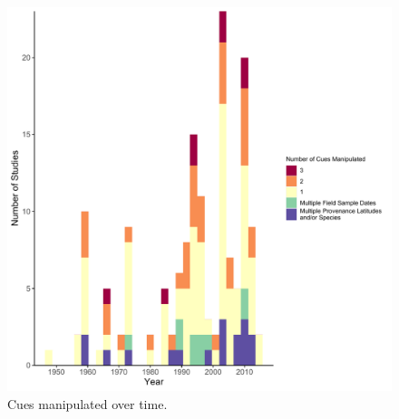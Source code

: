 \documentclass[11pt,letter]{article}
\begin{document}
\begin{figure}[t!]
\centering
\includegraphics[width=1\textwidth]{..//..//analyses/limitingcues/figures/studyyearcues.pdf}
\caption{Cues manipulated over time.}
  \label{fig:ts}
\end{figure}

\clearpage
\end{document}
